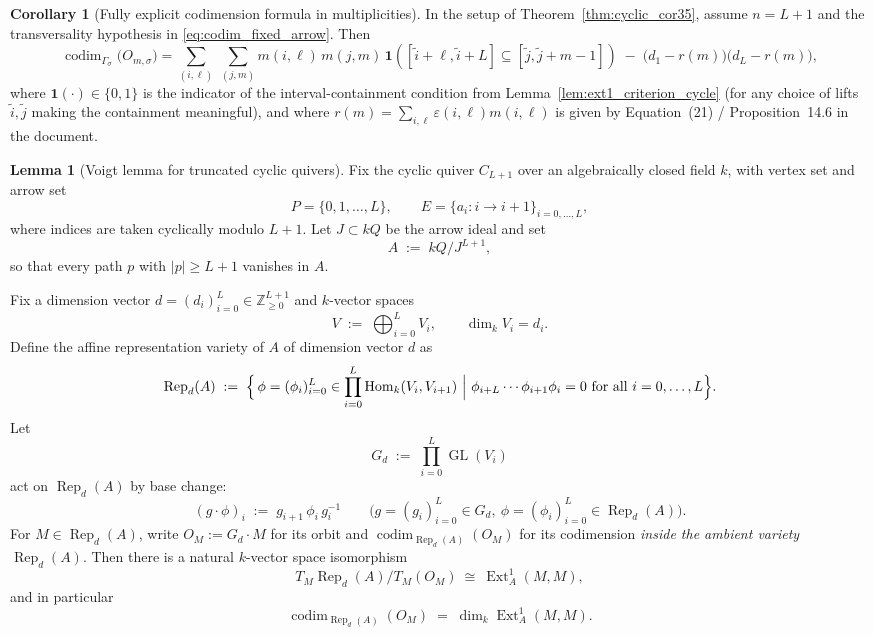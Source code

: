 \documentclass{article}
\newcommand{\Hom}{\operatorname{Hom}}
\newcommand{\Rep}{\operatorname{Rep}}
\newcommand{\codim}{\operatorname{codim}}
\newcommand{\Ext}{\operatorname{Ext}}
\newcommand{\GL}{\operatorname{GL}}
\theoremstyle{definition}
\newtheorem{lemma}[theorem]{Lemma}
\newtheorem{corollary}[theorem]{Corollary}
\begin{document}
\begin{corollary}[Fully explicit codimension formula in multiplicities]\label{cor:explicit_codim_cycle}
In the setup of Theorem~\ref{thm:cyclic_cor35}, assume $n=L+1$ and the transversality hypothesis in \eqref{eq:codim_fixed_arrow}.
Then
\[
\codim_{\Gamma_\sigma}\!\big(O_{m,\sigma}\big)
=
\sum_{(i,\ell)}\ \sum_{(j,m)}
m(i,\ell)\,m(j,m)\,
\mathbf{1}\!\left([\tilde i+\ell,\tilde i+L]\subseteq[\tilde j,\tilde j+m-1]\right)
\;-\;\bigl(d_1-r(m)\bigr)\bigl(d_L-r(m)\bigr),
\]
where $\mathbf{1}(\cdot)\in\{0,1\}$ is the indicator of the interval-containment condition from
Lemma~\ref{lem:ext1_criterion_cycle} (for any choice of lifts $\tilde i,\tilde j$ making the containment meaningful),
and where $r(m)=\sum_{i,\ell}\varepsilon(i,\ell)m(i,\ell)$ is given by Equation~(21) / Proposition~14.6 in the document. \ \ \textup{\cite{turn5file2}}
\end{corollary}
\begin{lemma}[Voigt lemma for truncated cyclic quivers]\label{lem:voigt_trunc_cycle}
Fix the cyclic quiver $C_{L+1}$ over an algebraically closed field $k$, with vertex set and arrow set
\[
P=\{0,1,\ldots,L\},\qquad E=\{a_i:i\to i+1\}_{i=0,\ldots,L},
\]
where indices are taken cyclically modulo $L+1$. Let $J\subset kQ$ be the arrow ideal and set
\[
A \;:=\; kQ/J^{L+1},
\]
so that every path $p$ with $|p|\ge L+1$ vanishes in $A$.

Fix a dimension vector $d=(d_i)_{i=0}^{L}\in \mathbb{Z}_{\ge 0}^{L+1}$ and $k$-vector spaces
\[
V \;:=\; \bigoplus_{i=0}^{L} V_i,\qquad \dim_k V_i=d_i.
\]
Define the affine representation variety of $A$ of dimension vector $d$ as
\[
\Rep_d(A)\;:=\;\Bigl\{\, \phi=(\phi_i)_{i=0}^{L}\in \prod_{i=0}^{L}\Hom_k(V_i,V_{i+1})
\ \Big|\ \phi_{i+L}\cdots \phi_{i+1}\phi_i=0\ \text{for all }i=0,\ldots,L \Bigr\}.
\]
Let
\[
G_d \;:=\; \prod_{i=0}^{L} \GL(V_i)
\]
act on $\Rep_d(A)$ by base change:
\[
(g\cdot \phi)_i \;:=\; g_{i+1}\,\phi_i\,g_i^{-1}\qquad \bigl(g=(g_i)_{i=0}^{L}\in G_d,\ \phi=(\phi_i)_{i=0}^{L}\in \Rep_d(A)\bigr).
\]
For $M\in \Rep_d(A)$, write $O_M:=G_d\cdot M$ for its orbit and $\codim_{\Rep_d(A)}(O_M)$ for its
codimension \emph{inside the ambient variety $\Rep_d(A)$}. Then there is a natural $k$-vector space isomorphism
\[
T_M\Rep_d(A)\big/ T_M(O_M)\ \cong\ \Ext^1_A(M,M),
\]
and in particular
\[
\codim_{\Rep_d(A)}(O_M)\;=\;\dim_k \Ext^1_A(M,M).
\]
\end{lemma}
\end{document}
